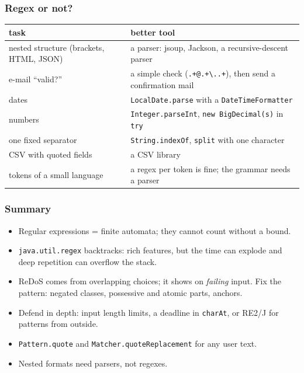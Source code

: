 \documentclass[aspectratio=169,10pt,compress]{beamer}
\begin{document}
\begin{frame}[t,fragile] \frametitle{Regex or not?}
  \begin{center}\footnotesize
  \begin{tabular}{@{}L{0.36\textwidth}L{0.58\textwidth}@{}}
    \toprule
    \textbf{task}                          & \textbf{better tool} \\
    \midrule
    nested structure (brackets, HTML, JSON) & a parser: jsoup, Jackson, a recursive-descent parser \\
    e-mail ``valid?''                       & a simple check (\texttt{.+@.+\textbackslash..+}), then send a confirmation mail \\
    dates                                   & \texttt{LocalDate.parse} with a \texttt{DateTimeFormatter} \\
    numbers                                 & \texttt{Integer.parseInt}, \texttt{new BigDecimal(s)} in \texttt{try} \\
    one fixed separator                     & \texttt{String.indexOf}, \texttt{split} with one character \\
    CSV with quoted fields                  & a CSV library \\
    tokens of a small language              & a regex per token is fine; the grammar needs a parser \\
    \bottomrule
  \end{tabular}
  \end{center}
\end{frame}





\begin{frame}[t,fragile] \frametitle{Summary}
  \begin{itemize}\small
    \item Regular expressions = finite automata; they cannot count without a bound.
    \item \texttt{java.util.regex} backtracks: rich features, but the time can explode and deep repetition can overflow the stack.
    \item ReDoS comes from overlapping choices; it shows on \emph{failing} input. Fix the pattern: negated classes, possessive and atomic parts, anchors.
    \item Defend in depth: input length limits, a deadline in \texttt{charAt}, or RE2/J for patterns from outside.
    \item \texttt{Pattern.quote} and \texttt{Matcher.quoteReplacement} for any user text.
    \item Nested formats need parsers, not regexes.
  \end{itemize}
\end{frame}
\end{document}
